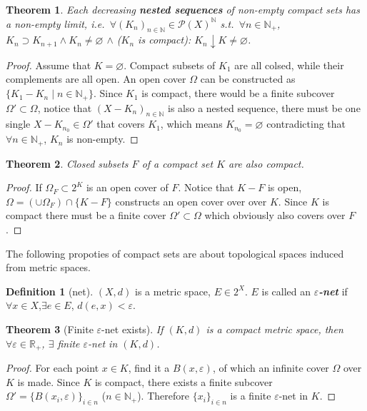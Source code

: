 \documentclass[openany]{book}
\newcommand*{\indexbf}[1]{\emph{\textbf{#1}}\index{#1}} %
\theoremstyle{plain}
\newtheorem{theorem}{Theorem}[section] %
\theoremstyle{definition}
\newtheorem{definition}{Definition}[section] %
\begin{document}
\begin{theorem}\label{theorem: compact nested sequences have non-empty limit}
	Each decreasing \emph{\textbf{nested sequences}} of non-empty compact sets has a non-empty limit, i.e.\ 
	$\forall (K_n)_{n \in \mathbb N} \in \mathscr P(X)^\mathbb N$ s.t.\ $\forall n \in \mathbb N_+$, $K_n \supset K_{n+1}\wedge K_n \neq \varnothing$ $\wedge$ ($K_n$ is compact): 
	$K_n \downarrow K \neq \varnothing$.
\end{theorem}
\begin{proof}
	Assume that $K = \varnothing$. 
	Compact subsets of $K_1$ are all colsed, while their complements are all open. An open cover $\varOmega$ can be constructed as $\{K_1 - K_n \mid n \in \mathbb N_+\}$. 
	Since $K_1$ is compact, there would be a finite subcover $\varOmega' \subset \varOmega$, notice that $(X - K_n)_{n \in \mathbb N}$ is also a nested sequence, there must be one single $X - K_{n_0} \in \varOmega'$ that covers $K_1$, which means $K_{n_0} = \varnothing$ contradicting that $\forall n \in \mathbb N_+$, $K_n$ is non-empty.
\end{proof}

\begin{theorem}\label{theorem: closed subset of compact set}
	Closed subsets $F$ of a compact set $K$ are also compact.
\end{theorem}
\begin{proof}
	If $\varOmega_F \subset 2^K$ is an open cover of $F$. 
	Notice that $K - F$ is open, $\varOmega = (\cup \varOmega_F) \cap \{K - F\}$ constructs an open cover over over $K$. 
	Since $K$ is compact there must be a finite cover $\varOmega' \subset \varOmega$ which obviously also covers over $F$.
\end{proof}

The following propoties of compact sets are about topological spaces induced from metric spaces.

\begin{definition}[net]\label{defintion: e-net}
	$(X, d)$ is a metric space, $E \in 2^X$. 
	$E$ is called an \indexbf{$\varepsilon$-net} if $\forall x \in X$,$\exists e \in E$, $d(e, x) < \varepsilon$.
\end{definition}

\begin{theorem}[Finite $\varepsilon$-net exists]\label{theorem: finite e-net exists (metric, compact)}
	If $(K, d)$ is a compact metric space, then $\forall \varepsilon \in \mathbb R_+$, $\exists$ \emph{finite} $\varepsilon$-net in $(K, d)$. 
\end{theorem}
\begin{proof}
	For each point $x\in K$, find it a $B(x,\varepsilon)$, of which an infinite cover $\Omega$ over $K$ is made. 
	Since $K$ is compact, there exists a finite subcover $\varOmega' = \{B(x_i,\varepsilon)\}_{i \in n}$ ($n \in \mathbb N_+$). Therefore $\{x_i\}_{i \in n}$ is a finite $\varepsilon$-net in $K$.
\end{proof}
\end{document}
